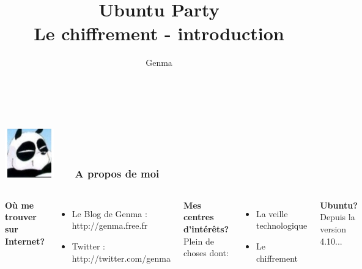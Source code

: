 \documentclass{beamer}
\title[Le chiffrement]{
Ubuntu Party \\
Le chiffrement - introduction}
\author{Genma}
\begin{document}
\begin{frame}
	\titlepage
	\vfill
	\begin{center}
		\\[2.5ex]
		{\tiny\CcNote{\CcLongnameByNcSa}}
		\vspace*{-2.5ex}
	\end{center}
\end{frame}





\begin{frame}
\frametitle{\includegraphics[scale=0.4]{./Illustrations/Genma.jpg} \ \ \  A propos de moi  }
\begin{columns}[c] 

\textbf{Où me trouver sur Internet?}
\begin{itemize}
\item Le Blog de Genma : http://genma.free.fr
\item Twitter : http://twitter.com/genma
\end{itemize}

\textbf{Mes centres d'intérêts?}
\\ Plein de choses dont:
\begin{itemize}
\item La veille technologique
\item Le chiffrement
\end{itemize}

\textbf{Ubuntu?}
Depuis la version 4.10...

\includegraphics[width=5cm,height=5cm]{./Illustrations/blog.png} 

\end{columns}
\end{frame}
\end{document}
